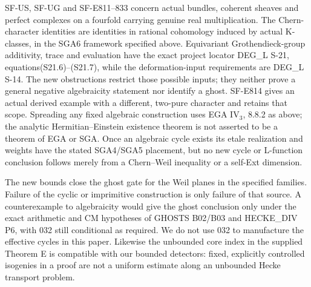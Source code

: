 SF-US, SF-UG and SF-E811--833 concern actual bundles, coherent sheaves and perfect complexes on a
fourfold carrying genuine real multiplication. The Chern-character
identities are identities in rational cohomology induced by actual
K-classes, in the SGA6 framework specified above. Equivariant
Grothendieck-group additivity, trace and evaluation have the exact
project locator DEG\_L S-21, equations(S21.6)--(S21.7), while the
deformation-input requirements are DEG\_L S-14. The new obstructions
restrict those possible inputs; they neither prove a general negative
algebraicity statement nor identify a ghost. SF-E814 gives an actual
derived example with a different, two-pure character and retains that
scope. Spreading any fixed algebraic construction uses EGA IV$_3$,
8.8.2 as above; the analytic Hermitian--Einstein existence theorem is
not asserted to be a theorem of EGA or SGA. Once an algebraic cycle
exists its etale realization and weights have the stated SGA4/SGA5
placement, but no new cycle or L-function conclusion follows merely
from a Chern--Weil inequality or a self-Ext dimension.

The new bounds close the ghost gate for the Weil planes in the
specified families. Failure of the cyclic or imprimitive construction
is only failure of that source. A counterexample to algebraicity
would give the ghost conclusion only under the exact arithmetic and
CM hypotheses of GHOSTS B02/B03 and HECKE\_DIV P6, with 032 still
conditional as required. We do not use 032 to manufacture the
effective cycles in this paper. Likewise the unbounded core index
in the supplied Theorem E is compatible with our bounded detectors:
fixed, explicitly controlled isogenies in a proof are not a uniform
estimate along an unbounded Hecke transport problem.
